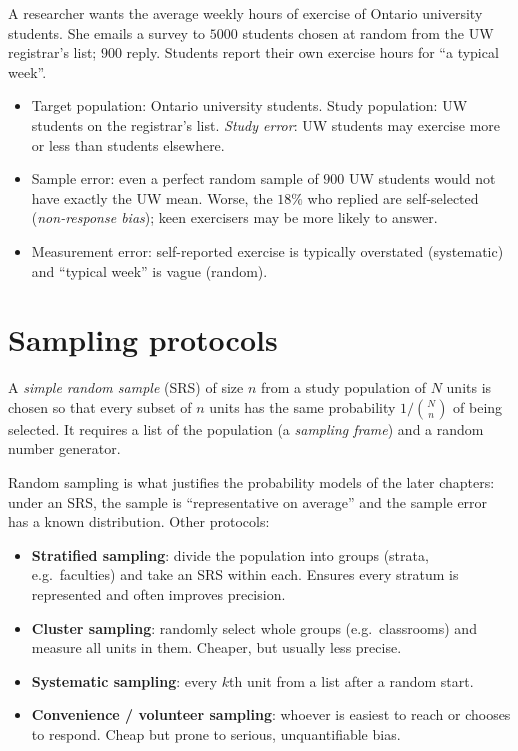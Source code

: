 \begin{example}
A researcher wants the average weekly hours of exercise of Ontario university students.
She emails a survey to $5000$ students chosen at random from the UW registrar's list; $900$
reply. Students report their own exercise hours for ``a typical week''.
\begin{itemize}
  \item Target population: Ontario university students. Study population: UW students
        on the registrar's list. \emph{Study error}: UW students may exercise more or less
        than students elsewhere.
  \item Sample error: even a perfect random sample of $900$ UW students would not have
        exactly the UW mean. Worse, the $18\%$ who replied are self-selected
        (\emph{non-response bias}); keen exercisers may be more likely to answer.
  \item Measurement error: self-reported exercise is typically overstated (systematic)
        and ``typical week'' is vague (random).
\end{itemize}
\end{example}

\section{Sampling protocols}

\begin{definition}
A \emph{simple random sample} (SRS) of size $n$ from a study population of $N$ units is
chosen so that every subset of $n$ units has the same probability $1/\binom Nn$ of being
selected. It requires a list of the population (a \emph{sampling frame}) and a random
number generator.
\end{definition}

Random sampling is what justifies the probability models of the later chapters: under
an SRS, the sample is ``representative on average'' and the sample error has a known
distribution. Other protocols:
\begin{itemize}
  \item \textbf{Stratified sampling}: divide the population into groups (strata, e.g.\
        faculties) and take an SRS within each. Ensures every stratum is represented and
        often improves precision.
  \item \textbf{Cluster sampling}: randomly select whole groups (e.g.\ classrooms) and
        measure all units in them. Cheaper, but usually less precise.
  \item \textbf{Systematic sampling}: every $k$th unit from a list after a random start.
  \item \textbf{Convenience / volunteer sampling}: whoever is easiest to reach or chooses
        to respond. Cheap but prone to serious, unquantifiable bias.
\end{itemize}

